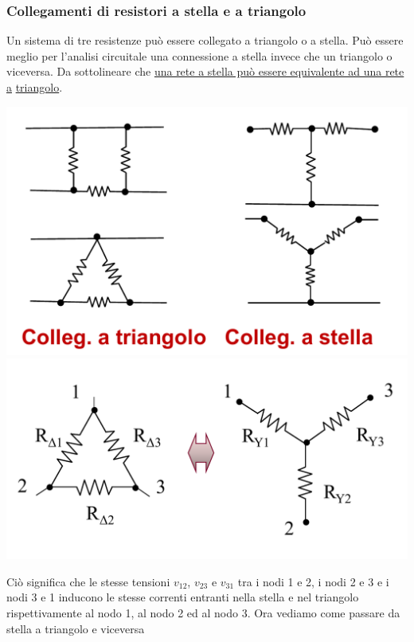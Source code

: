 \documentclass{article}
\begin{document}
\subsubsection{Collegamenti di resistori a stella e a triangolo}
Un sistema di tre resistenze
può essere collegato a
triangolo o a stella. Può essere
meglio per l'analisi circuitale
una connessione a stella invece
che un triangolo o viceversa.
Da sottolineare che \underline{una rete a stella può essere equivalente ad una rete a} \underline{triangolo}.
\begin{center}
    \includegraphics[scale=0.3]{Image/Stella triangolo.png}
    \includegraphics[scale=0.3]{Image/Nodi triangolo stella.png}
\end{center}
Ciò significa che le stesse tensioni $v_{12}$, $v_{23}$ e $v_{31}$ tra i nodi 1 e
2, i nodi 2 e 3 e i nodi 3 e 1 inducono le
stesse correnti entranti nella
stella e nel triangolo rispettivamente al nodo 1,
al nodo 2 ed al nodo 3.
Ora vediamo come passare da stella a triangolo e viceversa
\end{document}
